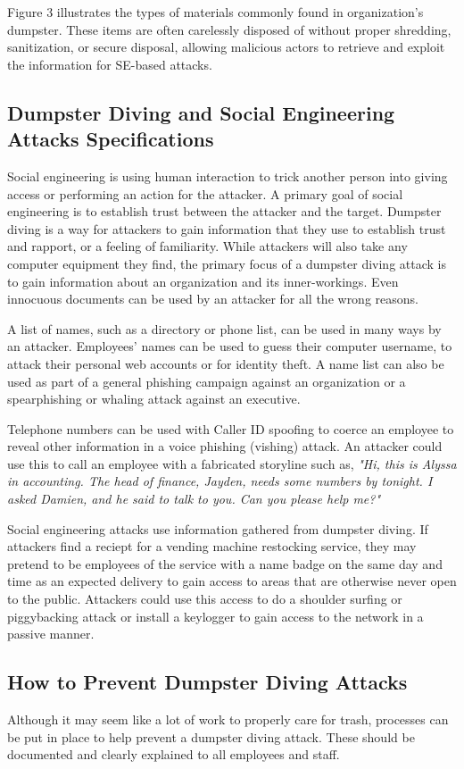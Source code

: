 {Figure 3 illustrates the types of materials commonly found in organization's dumpster. These items are often carelessly disposed of without proper shredding, sanitization, or secure disposal, allowing malicious actors to retrieve and exploit the information for SE-based attacks.

\subsection{Dumpster Diving and Social Engineering Attacks Specifications}
Social engineering is using human interaction to trick another person into giving access or performing an action for the attacker. A primary goal of social engineering is to establish trust between the attacker and the target. Dumpster diving is a way for attackers to gain information that they use to establish trust and rapport, or a feeling of familiarity. While attackers will also take any computer equipment they find, the primary focus of a dumpster diving attack is to gain information about an organization and its inner-workings. Even innocuous documents can be used by an attacker for all the wrong reasons.

A list of names, such as a directory or phone list, can be used in many ways by an attacker. Employees' names can be used to guess their computer username, to attack their personal web accounts or for identity theft. A name list can also be used as part of a general phishing campaign against an organization or a spearphishing or whaling attack against an executive.

Telephone numbers can be used with Caller ID spoofing to coerce an employee to reveal other information in a voice phishing (vishing) attack. An attacker could use this to call an employee with a fabricated storyline such as, \textit{"Hi, this is Alyssa in accounting. The head of finance, Jayden, needs some numbers by tonight. I asked Damien, and he said to talk to you. Can you please help me?"}

Social engineering attacks use information gathered from dumpster diving. If attackers find a reciept for a vending machine restocking service, they may pretend to be employees of the service with a name badge on the same day and time as an expected delivery to gain access to areas that are otherwise never open to the public. Attackers could use this access to do a shoulder surfing or piggybacking attack or install a keylogger to gain access to the network in a passive manner.

\subsection{How to Prevent Dumpster Diving Attacks}
Although it may seem like a lot of work to properly care for trash, processes can be put in place to help prevent a dumpster diving attack. These should be documented and clearly explained to all employees and staff.

}
